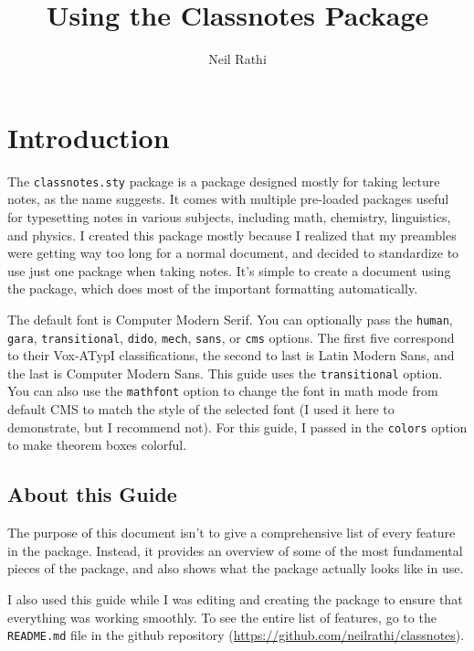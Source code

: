 \documentclass[11pt]{article}
\title{Using the Classnotes Package}
\author{Neil Rathi}
\begin{document}
\thispagestyle{empty}

\maketitle

\tableofcontents

\newpage

\section{Introduction}
The \texttt{classnotes.sty} package is a package designed mostly for taking lecture notes, as the name suggests. It comes with multiple pre-loaded packages useful for typesetting notes in various subjects, including math, chemistry, linguistics, and physics. I created this package mostly because I realized that my preambles were getting way too long for a normal document, and decided to standardize to use just one package when taking notes. It's simple to create a document using the package, which does most of the important formatting automatically.

The default font is Computer Modern Serif. You can optionally pass the \texttt{human}, \texttt{gara}, \texttt{transitional}, \texttt{dido}, \texttt{mech}, \texttt{sans}, or \texttt{cms} options. The first five correspond to their Vox-ATypI classifications, the second to last is Latin Modern Sans, and the last is Computer Modern Sans. This guide uses the \verb|transitional| option. You can also use the \verb|mathfont| option to change the font in math mode from default CMS to match the style of the selected font (I used it here to demonstrate, but I recommend not). For this guide, I passed in the \texttt{colors} option to make theorem boxes colorful.

\subsection{About this Guide}
The purpose of this document isn't to give a comprehensive list of every feature in the package. Instead, it provides an overview of some of the most fundamental pieces of the package, and also shows what the package actually looks like in use.

I also used this guide while I was editing and creating the package to ensure that everything was working smoothly. To see the entire list of features, go to the \texttt{README.md} file in the github repository (\url{https://github.com/neilrathi/classnotes}).
\end{document}

